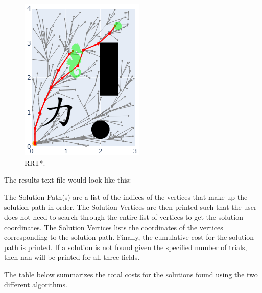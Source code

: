 \begin{figure}[H]
\begin{minipage}[b]{0.4\textwidth}
				\includegraphics[width=\textwidth]{links/rectangle_star.png}
				\caption{RRT*.}
			\end{minipage}
		\end{figure}

The results text file would look like this: 


The Solution Path(s) are a list of the indices of the vertices that make up the solution path in order. The Solution Vertices are then printed such that the user does not need to search through the entire list of vertices to get the solution coordinates. The Solution Vertices lists the coordinates of the vertices corresponding to the solution path. Finally, the cumulative cost for the solution path is printed. If a solution is not found given the specified number of trials, then nan will be printed for all three fields. 

The table below summarizes the total costs for the solutions found using the two different algorithms.

